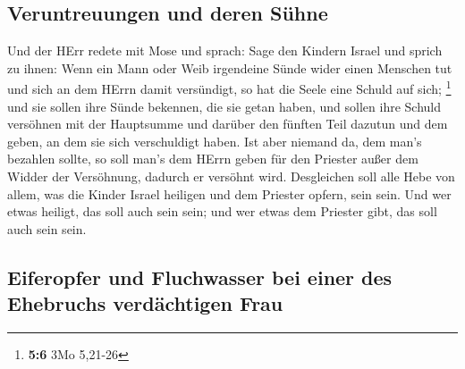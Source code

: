 \hypertarget{veruntreuungen-und-deren-suxfchne}{%
\subsection{Veruntreuungen und deren
Sühne}\label{veruntreuungen-und-deren-suxfchne}}

 Und der HErr redete mit Mose und sprach: 
Sage den Kindern Israel und sprich zu ihnen: Wenn ein Mann oder Weib
irgendeine Sünde wider einen Menschen tut und sich an dem HErrn damit
versündigt, so hat die Seele eine Schuld auf sich; \footnote{\textbf{5:6}
  3Mo 5,21-26}  und sie sollen ihre Sünde bekennen, die
sie getan haben, und sollen ihre Schuld versöhnen mit der Hauptsumme und
darüber den fünften Teil dazutun und dem geben, an dem sie sich
verschuldigt haben.  Ist aber niemand da, dem man's
bezahlen sollte, so soll man's dem HErrn geben für den Priester außer
dem Widder der Versöhnung, dadurch er versöhnt wird. 
Desgleichen soll alle Hebe von allem, was die Kinder Israel heiligen und
dem Priester opfern, sein sein.  Und wer etwas heiligt,
das soll auch sein sein; und wer etwas dem Priester gibt, das soll auch
sein sein.

\hypertarget{eiferopfer-und-fluchwasser-bei-einer-des-ehebruchs-verduxe4chtigen-frau}{%
\subsection{Eiferopfer und Fluchwasser bei einer des Ehebruchs
verdächtigen
Frau}\label{eiferopfer-und-fluchwasser-bei-einer-des-ehebruchs-verduxe4chtigen-frau}}

